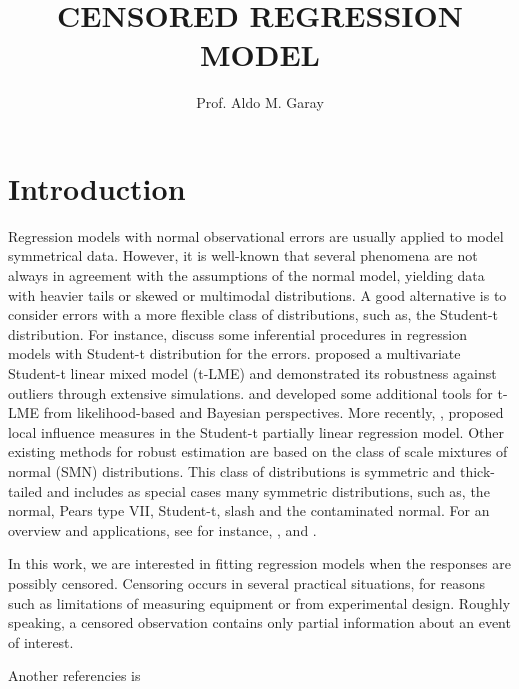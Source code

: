 \documentclass[11PT,preprint,authoryear]{elsarticle}
\begin{document}
\title{CENSORED REGRESSION MODEL}
\author{Prof. Aldo M. Garay}
\maketitle
\section{Introduction}

Regression models with normal observational errors  are usually
applied  to model symmetrical data. However, it is well-known that
several phenomena are not always in agreement with the assumptions
of the normal model, yielding data  with heavier tails or skewed or
multimodal distributions. A good alternative is to consider errors
with a more flexible class of distributions, such as, the Student-t
distribution. For instance, \cite{fernandez1999multivariate} discuss
some inferential procedures in regression models with Student-t
distribution for the errors. \cite{Pinheiro01} proposed a
multivariate Student-t linear mixed model (t-LME) and demonstrated its
robustness against outliers through extensive simulations.
\cite{lin2006bayesian} and \cite{lin2007bayesian} developed some
additional tools for t-LME from likelihood-based and Bayesian
perspectives. More recently, \cite{IbacachePulgar20111462}, proposed
local influence measures in the Student-t partially linear
regression model. Other existing methods for robust estimation are
based on the class of scale mixtures of normal  (SMN) distributions. This class of
distributions is symmetric and thick-tailed and includes as special
cases many symmetric distributions, such as, the normal, Pears
type VII, Student-t, slash and the contaminated normal. For an
overview and applications, see for instance, \cite{Andrews1974},
\citep{Lange93} and \cite{Rosa2003}.

In this work, we are interested in fitting  regression models when
the responses are possibly   censored.  Censoring occurs in several
practical situations, for reasons such as
limitations of measuring equipment or from experimental
design. Roughly speaking, a censored observation  contains only
partial information about an  event of interest.  

Another referencies is \cite{Branco2012}



\end{document}
